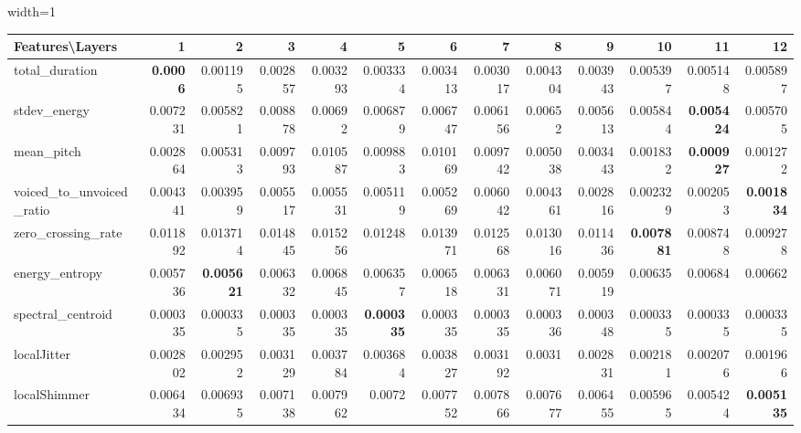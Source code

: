 \documentclass[sigconf]{acmart}
\newcommand{\mj}{Mockingjay\xspace}
\begin{document}
\begin{table*}[]
\begin{adjustbox}{width=1\textwidth}
\begin{tabular}{@{}l|rrrrrrrrrrrr@{}}
\toprule
\textbf{Features\textbackslash{}Layers} & 1 & 2 & 3 & 4 & 5 & 6 & 7 & 8 & 9 & 10 & 11 & 12 \\ \midrule
total\_duration & \textbf{0.0006} & 0.001195 & 0.002857 & 0.003293 & 0.003334 & 0.003413 & 0.003017 & 0.004304 & 0.003943 & 0.005397 & 0.005148 & 0.005897 \\
stdev\_energy & 0.007231 & 0.005821 & 0.008878 & 0.00692 & 0.006879 & 0.006747 & 0.006156 & 0.00652 & 0.005613 & 0.005844 & \textbf{0.005424} & 0.005705 \\
mean\_pitch & 0.002864 & 0.005313 & 0.009793 & 0.010587 & 0.009883 & 0.010169 & 0.009742 & 0.005038 & 0.003443 & 0.001832 & \textbf{0.000927} & 0.001272 \\
voiced\_to\_unvoiced\_ratio & 0.004341 & 0.003959 & 0.005517 & 0.005531 & 0.005119 & 0.005269 & 0.006042 & 0.004361 & 0.002816 & 0.002329 & 0.002053 & \textbf{0.001834} \\
zero\_crossing\_rate & 0.011892 & 0.013714 & 0.014845 & 0.015256 & 0.01248 & 0.013971 & 0.012568 & 0.013016 & 0.011436 & \textbf{0.007881} & 0.008748 & 0.009278 \\
energy\_entropy & 0.005736 & \textbf{0.005621} & 0.006332 & 0.006845 & 0.006357 & 0.006518 & 0.006331 & 0.006071 & 0.005919 & 0.00635 & 0.00684 & 0.00662 \\
spectral\_centroid & 0.000335 & 0.000335 & 0.000335 & 0.000335 & \textbf{0.000335} & 0.000335 & 0.000335 & 0.000336 & 0.000348 & 0.000335 & 0.000335 & 0.000335 \\
localJitter & 0.002802 & 0.002952 & 0.003129 & 0.003784 & 0.003684 & 0.003827 & 0.003192 & 0.0031 & 0.002831 & 0.002181 & 0.002076 & 0.001966 \\
localShimmer & 0.006434 & 0.006935 & 0.007138 & 0.007962 & 0.0072 & 0.007752 & 0.007866 & 0.007677 & 0.006455 & 0.005965 & 0.005424 & \textbf{0.005135}\\ \bottomrule
\end{tabular}
\end{adjustbox}
\vspace{1 mm}
\caption{\label{Audio_M}  \small Results (MSE) for audio features on {\mj} for native read speech corpus (Librispeech)}

\end{table*}
\end{document}
